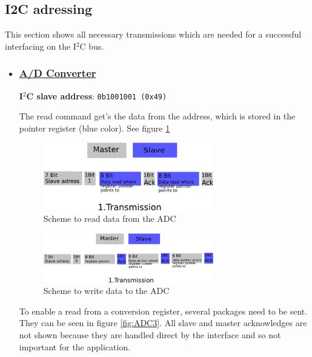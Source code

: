 \subsection{I2C adressing}
\label{sec:hardware:Components:Adressing}

This section shows all necessary transmissions which are needed for a successful interfacing on the I$^2$C bus. 

\begin{itemize}
	\item \subsubsection{\underline{\textbf{A/D Converter}}}
\label{sec:hardware:Components:Adressing:ADC}

\textbf{I$^2$C slave address}: \texttt{0b1001001 (0x49)}

The read command get's the data from the address, which is stored in the pointer register (blue color). See figure \ref{fig:ADC1}

\begin{figure}[H]
	\centering\includegraphics[width=0.7\textwidth]{fig/I2C_Adressing/ADC_read}
	\caption{Scheme to read data from the ADC}
	\label{fig:ADC1}
\end{figure}

\begin{figure}[H]
	\centering\includegraphics[width=0.7\textwidth]{fig/I2C_Adressing/ADC_write}
	\caption{Scheme to write data to the ADC}
	\label{fig:ADC2}
\end{figure}

To enable a read from a conversion register, several packages need to be sent. They can be seen in figure \ref{fig:ADC3}. All slave and master acknowledges are not shown because they are handled direct by the interface and so not important for the application.


\end{itemize}
